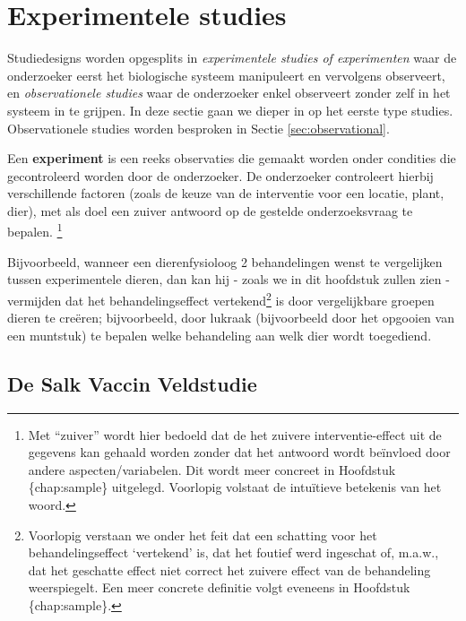 \documentclass[12pt,dutch,coursenotes]{book}
\let\rmarkdownfootnote\footnote%
\def\footnote{\protect\rmarkdownfootnote}
\theoremstyle{definition}
\theoremstyle{definition}
\theoremstyle{definition}
\theoremstyle{remark}
\let\BeginKnitrBlock\begin \let\EndKnitrBlock\end
\begin{document}
\section{Experimentele studies}\label{experimentele-studies}

Studiedesigns worden opgesplits in \emph{experimentele studies of
experimenten} waar de onderzoeker eerst het biologische systeem
manipuleert en vervolgens observeert, en \emph{observationele studies}
waar de onderzoeker enkel observeert zonder zelf in het systeem in te
grijpen. In deze sectie gaan we dieper in op het eerste type studies.
Observationele studies worden besproken in Sectie
\ref{sec:observational}.

\BeginKnitrBlock{definition}[experiment]
\protect\hypertarget{def:unnamed-chunk-10}{}{\label{def:unnamed-chunk-10}
\iffalse (experiment) \fi{} }Een \textbf{experiment} is een reeks
observaties die gemaakt worden onder condities die gecontroleerd worden
door de onderzoeker. De onderzoeker controleert hierbij verschillende
factoren (zoals de keuze van de interventie voor een locatie, plant,
dier), met als doel een zuiver antwoord op de gestelde onderzoeksvraag
te bepalen. \footnote{Met ``zuiver'' wordt hier bedoeld dat de het
  zuivere interventie-effect uit de gegevens kan gehaald worden zonder
  dat het antwoord wordt beïnvloed door andere aspecten/variabelen. Dit
  wordt meer concreet in Hoofdstuk \{chap:sample\} uitgelegd. Voorlopig
  volstaat de intuïtieve betekenis van het woord.}
\EndKnitrBlock{definition}

Bijvoorbeeld, wanneer een dierenfysioloog 2 behandelingen wenst te
vergelijken tussen experimentele dieren, dan kan hij - zoals we in dit
hoofdstuk zullen zien - vermijden dat het behandelingseffect
vertekend\footnote{Voorlopig verstaan we onder het feit dat een
  schatting voor het behandelingseffect `vertekend' is, dat het foutief
  werd ingeschat of, m.a.w., dat het geschatte effect niet correct het
  zuivere effect van de behandeling weerspiegelt. Een meer concrete
  definitie volgt eveneens in Hoofdstuk \{chap:sample\}.} is door
vergelijkbare groepen dieren te creëren; bijvoorbeeld, door lukraak
(bijvoorbeeld door het opgooien van een muntstuk) te bepalen welke
behandeling aan welk dier wordt toegediend.

\subsection{De Salk Vaccin Veldstudie}\label{de-salk-vaccin-veldstudie}
\end{document}
